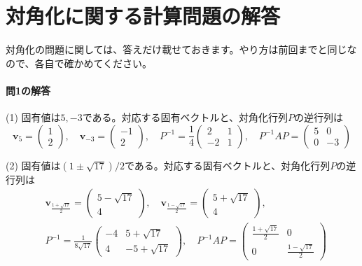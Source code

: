 \section{対角化に関する計算問題の解答}

対角化の問題に関しては、答えだけ載せておきます。やり方は前回までと同じなので、各自で確かめてください。

\paragraph{問1の解答}
(1) 固有値は$5, -3$である。対応する固有ベクトルと、対角化行列$P$の逆行列は
\[
\bm{v}_5 = 
\begin{pmatrix}
1 \\
2
\end{pmatrix}, \quad
\bm{v}_{-3} = 
\begin{pmatrix}
-1 \\
2
\end{pmatrix}, \quad
P^{-1} = 
\frac{1}{4}
\begin{pmatrix}
2 & 1 \\
-2 & 1
\end{pmatrix}, \quad
P^{-1} AP =
\begin{pmatrix}
5 & 0 \\
0 & -3
\end{pmatrix}
\]

(2) 固有値は$(1 \pm \sqrt{17})/2$である。対応する固有ベクトルと、対角化行列$P$の逆行列は
\begin{align*}
&\bm{v}_{\frac{1 + \sqrt{17}}{2}} = 
\begin{pmatrix}
5 - \sqrt{17} \\
4
\end{pmatrix}, \quad
\bm{v}_{\frac{1 - \sqrt{17}}{2}} = 
\begin{pmatrix}
5 + \sqrt{17} \\
4
\end{pmatrix}, \\
& P^{-1} = 
\frac{1}{8\sqrt{17}}
\begin{pmatrix}
-4 & 5 + \sqrt{17} \\
4 & -5 + \sqrt{17}
\end{pmatrix}, \quad
P^{-1} AP =
\begin{pmatrix}
\frac{1 + \sqrt{17}}{2} & 0 \\
0 & \frac{1 - \sqrt{17}}{2}
\end{pmatrix}
\end{align*}

